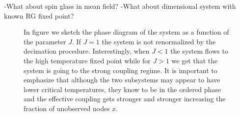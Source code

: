 \documentclass[aps,pre,noshowpacs]{revtex4}
\begin{document}
-What about spin glass in mean field?
-What about dimensional system with known RG fixed point?
\begin{figure}[h]
\caption{In figure we sketch the phase diagram of the system as a function of the parameter $J$. If $J=1$ the system is not renormalized by the decimation procedure. Interestingly, when $J<1$ the system flows to the high temperature fixed point while
for $J>1$ we get that the system is going to the strong coupling regime. It is important to emphasize that although the two subsystems may appear to have lower critical temperatures, they know to be in the ordered phase and the effective coupling gets stronger and stronger increasing the fraction of unobserved nodes $x$.}
\end{figure} 
\end{document}
